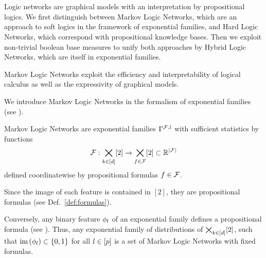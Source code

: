 \chapter{\chatextnetworkRepresentation}\label{cha:networkRepresentation}

Logic networks are graphical models with an interpretation by propositional logics.
We first distinguish between Markov Logic Networks, which are an approach to soft logics in the framework of exponential families, and Hard Logic Networks, which correspond with propositional knowledge bases.
Then we exploit non-trivial boolean base measures to unify both approaches by Hybrid Logic Networks, which are itself in exponential families.







Markov Logic Networks exploit the efficiency and interpretability of logical calculus as well as the expressivity of graphical models. 


We introduce Markov Logic Networks in the formalism of exponential families (see ).

\begin{definition}
	Markov Logic Networks are exponential families $\Gamma^{\mathcal{F},\mathbb{I}}$ with sufficient statistics by functions
		\[ \mathcal{F} : \bigtimes_{k\in[d]}[2] \rightarrow \bigtimes_{f\in\mathcal{F}}[2] \subset \mathbb{R}^{\left|\mathcal{F}\right|} \]
	defined coordinatewise by propositional formulas $f\in\mathcal{F}$.
\end{definition}

Since the image of each feature is contained in $[2]$, they are propositional formulas (see Def.~\ref{def:formulas}).

Conversely, any binary feature $\phi_{l}$ of an exponential family defines a propositional formula (see ).
Thus, any exponential family of distributions of $\bigtimes_{k\in[d]}[2]$, such that $\mathrm{im}\left(\phi_{l}\right)\subset\{0,1\}$ for all $l\in[p]$ is a set of Markov Logic Networks with fixed formulas.

